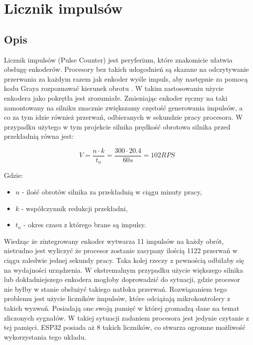     \section{Licznik impulsów}
        \subsection{Opis}
            Licznik impulsów (Pulse Counter) jest peryferium, które znakomicie ułatwia obsługę enkoderów. Procesory bez takich udogodnień są skazane na odczytywanie przerwania za każdym razem jak enkoder wyśle impuls, aby następnie za pomocą kodu Graya rozpoznawać kierunek obrotu \cite{gray}. W takim zastosowaniu użycie enkodera jako pokrętła jest zrozumiałe. Zmieniając enkoder ręczny na taki zamontowany na silniku znacznie zwiększamy częstość generowania impulsów, a co za tym idzie również przerwań, odbieranych w sekundzie pracy procesora. W przypadku użytego w tym projekcie silnika prędkość obrotowa silnika przed przekładnią równa jest:
            
            \begin{displaymath}
              V = \frac{ n \cdot k}{t_{n}} = \frac{ 300 \cdot 20.4 }{60s} = 102 RPS
            \end{displaymath}
            
            Gdzie:
            \begin{itemize}
                \item $n$ - ilość obrotów silnika za przekładnią w ciągu minuty pracy,
                \item $k$ - współczynnik redukcji przekładni,
                \item $t_{n}$ - okres czasu z którego brane są impulsy.
            \end{itemize}
            
            Wiedząc że zintegrowany enkoder wytwarza 11 impulsów na każdy obrót, nietrudno jest wyliczyć że procesor zostanie zasypany ilością 1122 przerwań w ciągu zaledwie jednej sekundy pracy. Taka kolej rzeczy z pewnością odbiłaby się na wydajności urządzenia. W ekstremalnym przypadku użycie większego silnika lub dokładniejszego enkodera mogłoby doprowadzić do sytuacji, gdzie procesor nie byłby w stanie obsłużyć takiego natłoku przerwań. Rozwiązaniem tego problemu jest użycie liczników impulsów, które odciążają mikrokontrolery z takich wyzwań. Posiadają one swoją pamięć w której gromadzą dane na temat zliczonych sygnałów. W takiej sytuacji zadaniem procesora jest jedynie czytanie z tej pamięci. ESP32 posiada aż 8 takich liczników, co stwarza ogromne możliwość wykorzystania tego układu.
            
